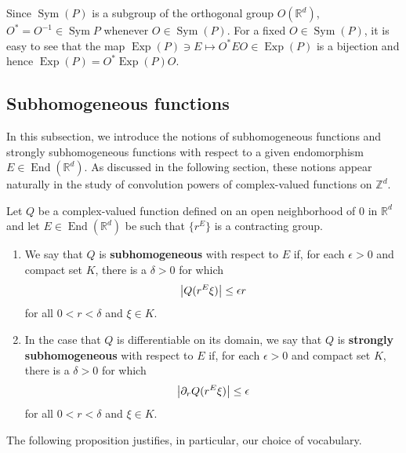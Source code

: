 \documentclass[smallextended]{svjour3}
\theoremstyle{remark}
\renewenvironment{proof}[1][\proofname]{\renewcommand\xproofname{#1}\xproof}{\endxproof}
\newcommand\End{\operatorname{End}} %
\newcommand\Sym{\operatorname{Sym}}
\newcommand\Exp{\operatorname{Exp}}
\begin{document}
\begin{proof}
Since $\Sym(P)$ is a subgroup of the orthogonal group $O(\mathbb{R}^d)$, $O^* = O^{-1} \in \Sym{P}$ whenever $O\in\Sym(P)$. For a fixed $O\in\Sym(P)$, it is easy to see that the map $\Exp(P)\ni E\mapsto  O^* E O\in\Exp(P)$ is a bijection and hence $\Exp(P)=O^* \Exp(P) O$. 
\end{proof}



\subsection{Subhomogeneous functions}\label{subsec:SubhomogeneousFunctions}
In this subsection, we introduce the notions of subhomogeneous functions and strongly subhomogeneous functions with respect to a given endomorphism $E\in\End(\mathbb{R}^d)$. As discussed in the following section, these notions appear naturally in the study of convolution powers of complex-valued functions on $\mathbb{Z}^d$.

\begin{definition}\label{def:homogeneous_types}
Let $Q$ be a complex-valued function defined on an open neighborhood of $0$ in $\mathbb{R}^d$ and let $E\in\End(\mathbb{R}^d)$ be such that $\{r^E\}$ is a contracting group.
\begin{enumerate}
\item We say that $Q$ is \textbf{subhomogeneous} with respect to $E$ if, for each $\epsilon>0$ and compact set $K$, there is a $\delta>0$ for which
\begin{equation*}
\abs{Q(r^E\xi)}\leq \epsilon r
\end{equation*}
for all $0<r<\delta$ and $\xi\in K$.
\item In the case that $Q$ is differentiable on its domain, we say that $Q$ is \textbf{strongly subhomogeneous} with respect to $E$ if, for each $\epsilon>0$ and compact set $K$, there is a $\delta>0$ for which
\begin{equation*}
\abs{\partial_r Q(r^E\xi)}\leq \epsilon
\end{equation*}
for all $0<r<\delta$ and $\xi\in K$.
\end{enumerate}
\end{definition}

\noindent The following proposition justifies, in particular, our choice of vocabulary.
\end{document}
